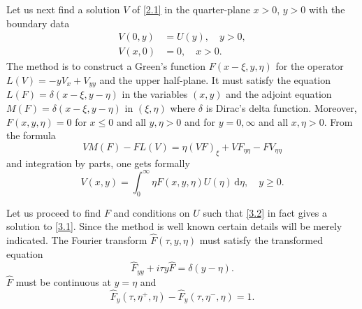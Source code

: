 \documentclass[leqno]{article}
\numberwithin{equation}{section}
\theoremstyle{plain}
\newcommand{\dd}{\,\mathrm{d}}
\begin{document}
\section{}
\label{sec3}

Let us next find a solution $V$ of \eqref{2.1} in the quarter-plane $x>0$, $y>0$ with the boundary data
\begin{align}
	\label{3.1}
	V(0,y) &= U(y), \quad y > 0,
	\\
	\nonumber
	V(x,0) &= 0, \quad x > 0.
\end{align}
The method is to construct a Green's function $F(x-\xi,y,\eta)$ for the operator $L(V)=-yV_x+V_{yy}$ and the upper half-plane.
It must satisfy the equation $L(F)=\delta(x-\xi,y-\eta)$ in the variables $(x,y)$ and the adjoint equation $M(F) = \delta(x-\xi,y-\eta)$ in $(\xi,\eta)$ where $\delta$ is Dirac's delta function.
Moreover, $F(x,y,\eta) = 0$ for $x \leq 0$ and all $y, \eta > 0$ and for $y=0,\infty$ and all $x,\eta > 0$.
From the formula
\begin{equation*}
	VM(F) - FL(V) = \eta (VF)_\xi + VF_{\eta\eta} - F V_{\eta\eta}
\end{equation*}
and integration by parts, one gets formally
\begin{equation}
	\label{3.2}
	V(x,y) = \int_0^{\infty} \eta F(x,y,\eta) U(\eta) \dd \eta, \quad y \geq 0.
\end{equation}

Let us proceed to find $F$ and conditions on $U$ such that \eqref{3.2} in fact gives a solution to \eqref{3.1}.
Since the method is well known certain details will be merely indicated.
The Fourier transform $\hat{F}(\tau,y,\eta)$ must satisfy the transformed equation
\begin{equation*}
	\hat{F}_{yy} + i\tau y \hat{F} = \delta(y-\eta).
\end{equation*}
$\hat{F}$ must be continuous at $y = \eta$ and
\begin{equation*}
	\hat{F}_y(\tau,\eta^+,\eta)-\hat{F}_y(\tau,\eta^-,\eta)=1.
\end{equation*}
\end{document}
